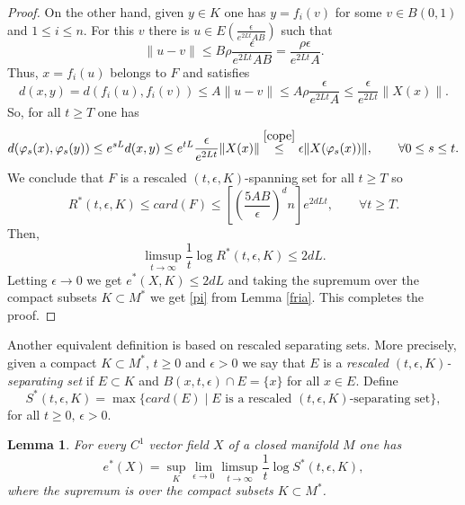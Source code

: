 \documentclass{amsart}
\newtheorem{lem}{Lemma}
\numberwithin{equation}{section}
\begin{document}
\begin{proof}
On the other hand, given $y\in K$ one has $y=f_i(v)$ for some $v\in B(0,1)$ and $1\leq i\leq n$.
For this $v$ there is $u\in E(\frac{\epsilon}{e^{2Lt}AB})$ such that
$$
\|u-v\|\leq B\rho\frac{\epsilon}{e^{2Lt}AB}=\frac{\rho\epsilon}{e^{2Lt}A}.
$$
Thus, $x=f_i(u)$ belongs to $F$ and satisfies
$$
d(x,y)=d(f_i(u),f_i(v))\leq A\|u-v\|\leq A\rho\frac{\epsilon}{e^{2Lt}A}\leq \frac{\epsilon}{e^{2Lt}}\|X(x)\|.
$$
So, for all $t\geq T$ one has
$$
d(\varphi_s(x),\varphi_s(y))\leq e^{sL}d(x,y)\leq e^{tL}\frac{\epsilon}{e^{2Lt}}\|X(x)\|
\overset{\eqref{cope}}{\leq} \epsilon\|X(\varphi_s(x))\|,\quad\quad\forall 0\leq s\leq t.
$$
We conclude that $F$ is a rescaled $(t,\epsilon,K)$-spanning set for all $t\geq T$ so
$$
R^*(t,\epsilon,K)\leq card(F)\leq  \left[\left(\frac{5AB}{\epsilon}\right)^dn\right]e^{2dLt},\quad\quad\forall t\geq T.
$$
Then,
$$
\limsup_{t\to\infty}\frac{1}t\log R^*(t,\epsilon,K)\leq 2dL.
$$
Letting $\epsilon\to0$ we get $e^*(X,K)\leq 2dL$
and taking
the supremum over the compact subsets $K\subset M^*$ we get \eqref{pi}
from Lemma \ref{fria}. This completes the proof.
\end{proof}




Another equivalent definition is based on rescaled separating sets. More precisely, given a compact $K\subset M^*$, $t\geq0$ and $\epsilon>0$ we say that $E$ is a {\em rescaled $(t,\epsilon,K)$-separating set} if
$E\subset K$ and $B(x,t,\epsilon)\cap E=\{x\}$ for all $x\in E$.
Define
$$
S^*(t,\epsilon,K)=\max\{card(E)\mid E\mbox{ is a rescaled $(t,\epsilon,K)$-separating set}\},
$$
for all $t\geq0,\, \epsilon>0.$

\begin{lem}
\label{rasca}
For every $C^1$ vector field $X$ of a closed manifold $M$ one has
$$
e^*(X)=\sup_K\lim_{\epsilon\to0}\limsup_{t\to\infty}\frac{1}t\log S^*(t,\epsilon,K),
$$
where the supremum is over the compact subsets $K\subset M^*$.
\end{lem}
\end{document}
